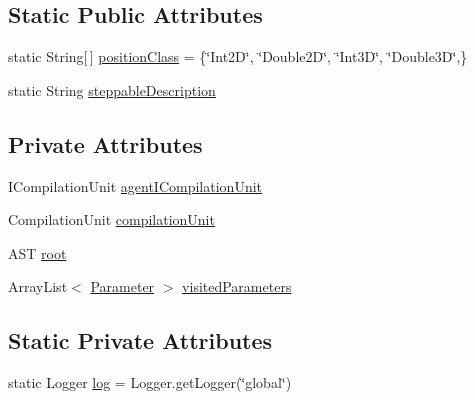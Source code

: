 \subsection*{Static Public Attributes}
\begin{DoxyCompactItemize}
\item 
static String\mbox{[}$\,$\mbox{]} \hyperlink{classit_1_1isislab_1_1masonhelperdocumentation_1_1analizer_1_1_agent_analizer_a9d8e56c5d7ee2102e06e509b301205bb}{position\-Class} = \{\char`\"{}Int2\-D\char`\"{}, \char`\"{}Double2\-D\char`\"{}, \char`\"{}Int3\-D\char`\"{}, \char`\"{}Double3\-D\char`\"{},\}
\item 
static String \hyperlink{classit_1_1isislab_1_1masonhelperdocumentation_1_1analizer_1_1_agent_analizer_ada4b9766b061207045f6b7110e7e8ed6}{steppable\-Description}
\end{DoxyCompactItemize}
\subsection*{Private Attributes}
\begin{DoxyCompactItemize}
\item 
I\-Compilation\-Unit \hyperlink{classit_1_1isislab_1_1masonhelperdocumentation_1_1analizer_1_1_agent_analizer_a5982c48c7c223886875d55c4b2383140}{agent\-I\-Compilation\-Unit}
\item 
Compilation\-Unit \hyperlink{classit_1_1isislab_1_1masonhelperdocumentation_1_1analizer_1_1_agent_analizer_a1fdd2196fdd7b7907ab94da91b8306f4}{compilation\-Unit}
\item 
A\-S\-T \hyperlink{classit_1_1isislab_1_1masonhelperdocumentation_1_1analizer_1_1_agent_analizer_a43035809f1965186296ce39327323a14}{root}
\item 
Array\-List$<$ \hyperlink{classit_1_1isislab_1_1masonhelperdocumentation_1_1analizer_1_1_parameter}{Parameter} $>$ \hyperlink{classit_1_1isislab_1_1masonhelperdocumentation_1_1analizer_1_1_agent_analizer_a631132645fb74a4498f033579556efa9}{visited\-Parameters}
\end{DoxyCompactItemize}
\subsection*{Static Private Attributes}
\begin{DoxyCompactItemize}
\item 
static Logger \hyperlink{classit_1_1isislab_1_1masonhelperdocumentation_1_1analizer_1_1_agent_analizer_a17da3ff078911c8a90212bab3681f31e}{log} = Logger.\-get\-Logger(\char`\"{}global\char`\"{})
\end{DoxyCompactItemize}



